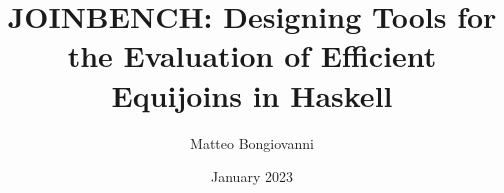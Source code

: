 \documentclass[a4paper, twoside]{report}
\title{JOINBENCH: Designing Tools for the Evaluation of Efficient Equijoins in Haskell}
\author{Matteo Bongiovanni}
\date{January 2023}
\begin{document}
\begin{comment}
General Information
The project report (occasionally referred to as a thesis) is an extremely
important aspect of the project. It serves to show what you have achieved and
should demonstrate that:

You understand the wider context of computing by relating your choice of project,
and the approach you take, to existing products or research.
You can apply the theoretical and practical techniques taught in the course to the
problem you are addressing and that you understand their relevance to the wider
world of computing.
You are capable of objectively criticising your own work and making constructive
suggestions for improvements or further work based on your experiences so far.
As a computing professional, you operate ethically and can explain your thinking
and working processes clearly and concisely to third parties who may not be
experts in the field in which you are working.
Most of the project assessors will not have followed the project throughout and
will only have a short time to listen to a presentation or see a demonstration.
For this reason they will rely heavily on the report to judge the project

Many students underestimate the importance of the report and make the mistake of
thinking that top marks can be achieved simply for producing a good product. This
is fundamentally not the case and many projects have been graded well below their
potential because of an indifferent or poor write-up. In order to get the balance
right you should consider that the aim of the project is to produce a good report
and that software, hardware, theory etc. that you developed during the project are
merely a means to this end. Don't make the mistake of leaving the write-up to the
last minute. Ideally you should produce the bulk of the report as you go along and
use the last week or two to bring it together into a coherent document.

It is helpful to get feedback from your supervisor about your project report, but
supervisors cannot be expected to look at documents written at the last minute or
at more than one chapter at a time. Allow plenty of time for this

Project Report Length
The nominal maximum report length is 60 pages, plus appendices. Shorter reports
may be appropriate for many projects and longer reports can be submitted with
prior approval (see below).

The page count includes:


\end{comment}
\end{document}
